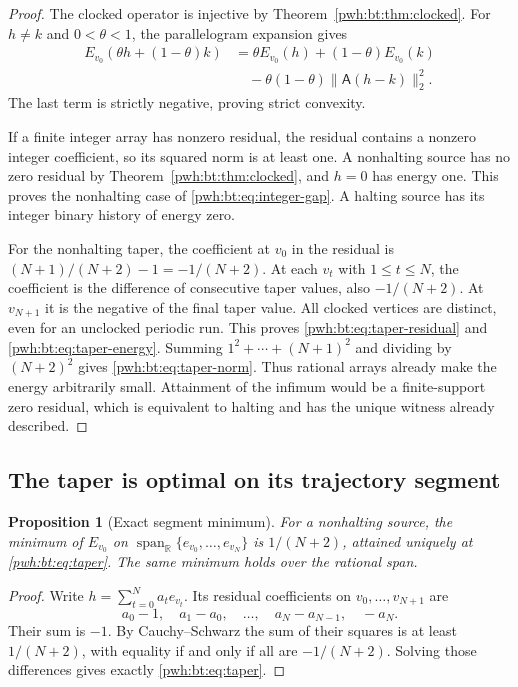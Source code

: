 \documentclass[11pt,letterpaper]{article}
\numberwithin{equation}{section}
\newtheorem{proposition}[theorem]{Proposition}
\theoremstyle{definition}
\newcommand{\R}{\mathbb R}
\newcommand{\Ann}{\mathsf{A}}
\begin{document}
\begin{proof}
The clocked operator is injective by Theorem~\ref{pwh:bt:thm:clocked}. For
$h\ne k$ and $0<\theta<1$, the parallelogram expansion gives
\begin{align*}
 E_{v_0}(\theta h+(1-\theta)k)
 &=\theta E_{v_0}(h)+(1-\theta)E_{v_0}(k)\\
 &\quad-\theta(1-\theta)\|\Ann(h-k)\|_2^2.
\end{align*}
The last term is strictly negative, proving strict convexity.

If a finite integer array has nonzero residual, the residual contains a
nonzero integer coefficient, so its squared norm is at least one. A
nonhalting source has no zero residual by Theorem~\ref{pwh:bt:thm:clocked}, and
$h=0$ has energy one. This proves the nonhalting case of
\eqref{pwh:bt:eq:integer-gap}. A halting source has its integer binary history
of energy zero.

For the nonhalting taper, the coefficient at $v_0$ in the residual is
$(N+1)/(N+2)-1=-1/(N+2)$. At each $v_t$ with $1\le t\le N$, the
coefficient is the difference of consecutive taper values, also
$-1/(N+2)$. At $v_{N+1}$ it is the negative of the final taper value.
All clocked vertices are distinct, even for an unclocked periodic run.
This proves \eqref{pwh:bt:eq:taper-residual} and \eqref{pwh:bt:eq:taper-energy}.
Summing $1^2+\cdots+(N+1)^2$ and dividing by $(N+2)^2$ gives
\eqref{pwh:bt:eq:taper-norm}. Thus rational arrays already make the energy
arbitrarily small. Attainment of the infimum would be a finite-support
zero residual, which is equivalent to halting and has the unique
witness already described.
\end{proof}

\subsection{The taper is optimal on its trajectory segment}
\begin{proposition}[Exact segment minimum]\label{pwh:bt:prop:segment}
For a nonhalting source, the minimum of $E_{v_0}$ on
$\operatorname{span}_{\R}\{e_{v_0},\ldots,e_{v_N}\}$ is $1/(N+2)$,
attained uniquely at \eqref{pwh:bt:eq:taper}. The same minimum holds over the
rational span.
\end{proposition}
\begin{proof}
Write $h=\sum_{t=0}^N a_te_{v_t}$. Its residual coefficients on
$v_0,\ldots,v_{N+1}$ are
\[
 a_0-1,\quad a_1-a_0,\quad\ldots,\quad a_N-a_{N-1},\quad -a_N.
\]
Their sum is $-1$. By Cauchy--Schwarz the sum of their squares is at
least $1/(N+2)$, with equality if and only if all are $-1/(N+2)$.
Solving those differences gives exactly \eqref{pwh:bt:eq:taper}.
\end{proof}
\end{document}

